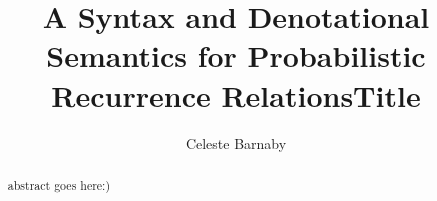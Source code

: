 \documentclass[12pt]{westhesis}
\title{A Syntax and Denotational Semantics for Probabilistic Recurrence Relations}
\theoremstyle{plain}
\theoremstyle{definition}
\begin{document}
\begin{abstract}
abstract goes here:)
\end{abstract}

\title{Title}
\author{Celeste Barnaby}

\maketitle
\makededication
\makeabstract
\tableofcontents









\end{document}

